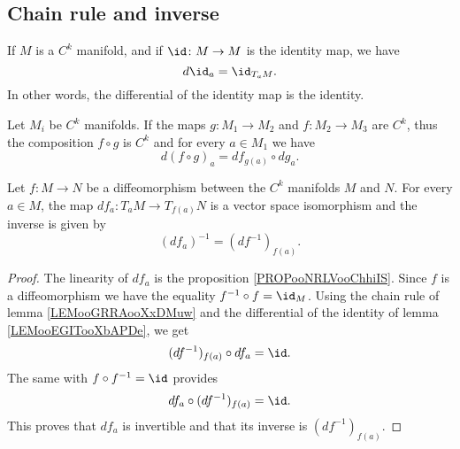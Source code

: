 \subsection{Chain rule and inverse}

\begin{lemma}       \label{LEMooEGITooXbAPDe}
	If \( M\) is a \( C^k\) manifold, and if \( \id\colon M\to M\) is the identity map, we have
	\begin{equation}
		d\id_a=\id_{T_aM}.
	\end{equation}
	In other words, the differential of the identity map is the identity.
\end{lemma}

\begin{lemma}       \label{LEMooGRRAooXxDMuw}
	Let \( M_i\) be \( C^k\) manifolds. If the maps \( g\colon M_1\to M_2\) and \( f\colon M_2\to M_3 \) are \( C^k\), thus the composition \( f\circ g\) is \( C^k\) and for every \( a\in M_1\) we have
	\begin{equation}
		d(f\circ g)_a=df_{g(a)}\circ dg_a.
	\end{equation}
\end{lemma}


\begin{proposition}       \label{PROPooPEMLooPQcywG}
	Let \( f\colon M\to N\) be a diffeomorphism between the \( C^k\) manifolds \( M\) and \( N\). For every \( a\in M\), the map \( df_a\colon T_aM\to T_{f(a)}N\) is a vector space isomorphism and the inverse is given by
	\begin{equation}
		(df_a)^{-1}=(df^{-1})_{f(a)}.
	\end{equation}
\end{proposition}

\begin{proof}
	The linearity of \( df_a\) is the proposition \ref{PROPooNRLVooChhiIS}. Since \( f\) is a diffeomorphism we have the equality \( f^{-1}\circ f=\id_M\). Using the chain rule of lemma \ref{LEMooGRRAooXxDMuw} and the differential of the identity of lemma \ref{LEMooEGITooXbAPDe}, we get
	\begin{equation}
		(df^{-1})_{f(a)}\circ df_a=\id.
	\end{equation}
	The same with \( f\circ f^{-1}=\id\) provides
	\begin{equation}
		df_a\circ(df^{-1})_{f(a)}=\id.
	\end{equation}
	This proves that \( df_a\) is invertible and that its inverse is \( (df^{-1})_{f(a)}\).
\end{proof}

